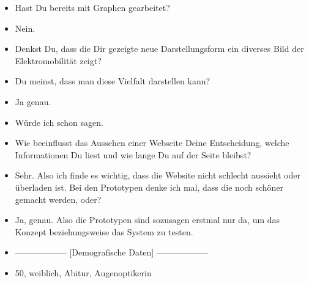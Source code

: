 {\begin{itemize}[]
              Dann, nachdem man sich eingearbeitet hat, denke ich, dass der Graph auch sehr gut ist.
        \item {} Hast Du bereits mit Graphen gearbeitet?
        \item {} Nein.
        \item {} Denkst Du, dass die Dir gezeigte neue Darstellungsform ein diverses Bild der Elektromobilität zeigt?
        \item {} Du meinst, dass man diese Vielfalt darstellen kann?
        \item {} Ja genau.
        \item {} Würde ich schon sagen.
        \item {} Wie beeinflusst das Aussehen einer Webseite Deine Entscheidung, welche Informationen Du liest und wie lange Du auf der Seite bleibst?
        \item {} Sehr.
              Also ich finde es wichtig, dass die Website nicht schlecht aussieht oder überladen ist.
              Bei den Prototypen denke ich mal, dass die noch schöner gemacht werden, oder?
        \item {} Ja, genau. Also die Prototypen sind sozusagen erstmal nur da, um das Konzept beziehungsweise das System zu testen.
        \item {------------------} [Demografische Daten] {------------------}
        \item {} 50, weiblich, Abitur, Augenoptikerin
    \end{itemize}}
\nolinenumbers
